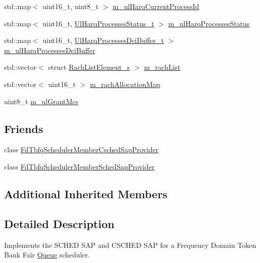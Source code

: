 \begin{DoxyCompactItemize}
\item 
std\+::map$<$ uint16\+\_\+t, uint8\+\_\+t $>$ \hyperlink{classns3_1_1FdTbfqFfMacScheduler_a36b22976070611aa3fdd5c573f891dc2}{m\+\_\+ul\+Harq\+Current\+Process\+Id}
\item 
std\+::map$<$ uint16\+\_\+t, \hyperlink{namespacens3_af765c4daaafe4ea4809c1041fc196629}{Ul\+Harq\+Processes\+Status\+\_\+t} $>$ \hyperlink{classns3_1_1FdTbfqFfMacScheduler_aa02927d2f9ea374d54c0fff160b5dbbc}{m\+\_\+ul\+Harq\+Processes\+Status}
\item 
std\+::map$<$ uint16\+\_\+t, \hyperlink{namespacens3_a042cbd6bf67e73911cba35b8c070223d}{Ul\+Harq\+Processes\+Dci\+Buffer\+\_\+t} $>$ \hyperlink{classns3_1_1FdTbfqFfMacScheduler_a8566c4093902c1a4c227fa795fa90756}{m\+\_\+ul\+Harq\+Processes\+Dci\+Buffer}
\item 
std\+::vector$<$ struct \hyperlink{structns3_1_1RachListElement__s}{Rach\+List\+Element\+\_\+s} $>$ \hyperlink{classns3_1_1FdTbfqFfMacScheduler_a0d2d08dad69997d048c8d35b5dac76e7}{m\+\_\+rach\+List}
\item 
std\+::vector$<$ uint16\+\_\+t $>$ \hyperlink{classns3_1_1FdTbfqFfMacScheduler_a046aaad84777461862179b30893e38ec}{m\+\_\+rach\+Allocation\+Map}
\item 
uint8\+\_\+t \hyperlink{classns3_1_1FdTbfqFfMacScheduler_ab528c9593f9398be49667dd8f7864488}{m\+\_\+ul\+Grant\+Mcs}
\end{DoxyCompactItemize}
\subsection*{Friends}
\begin{DoxyCompactItemize}
\item 
class \hyperlink{classns3_1_1FdTbfqFfMacScheduler_a4b513a821c5c70c5027baa42b42bfd22}{Fd\+Tbfq\+Scheduler\+Member\+Csched\+Sap\+Provider}
\item 
class \hyperlink{classns3_1_1FdTbfqFfMacScheduler_a15ddf7b82e9a0e193c9b8c83bedebf96}{Fd\+Tbfq\+Scheduler\+Member\+Sched\+Sap\+Provider}
\end{DoxyCompactItemize}
\subsection*{Additional Inherited Members}


\subsection{Detailed Description}
Implements the S\+C\+H\+ED S\+AP and C\+S\+C\+H\+ED S\+AP for a Frequency Domain Token Bank Fair \hyperlink{classns3_1_1Queue}{Queue} scheduler. 

